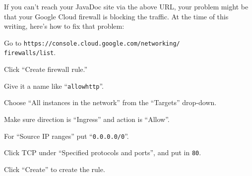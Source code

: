 If you can't reach your JavaDoc site via the above URL, your problem might be
that your Google Cloud firewall is blocking the traffic. At the time of this
writing, here's how to fix that problem:

\begin{compactenum}

\item Go to \texttt{https://console.cloud.google.com/networking/}\\\texttt{firewalls/list}.
\item Click ``Create firewall rule.''
\item Give it a name like ``\texttt{allowhttp}''.
\item Choose ``All instances in the network'' from the ``Targets'' drop-down.
\item Make sure direction is ``Ingress'' and action is ``Allow''.
\item For ``Source IP ranges'' put ``\texttt{0.0.0.0/0}''.
\item Click TCP under ``Specified protocols and ports'', and put in \texttt{80}.
\item Click ``Create'' to create the rule.
\end{compactenum}



